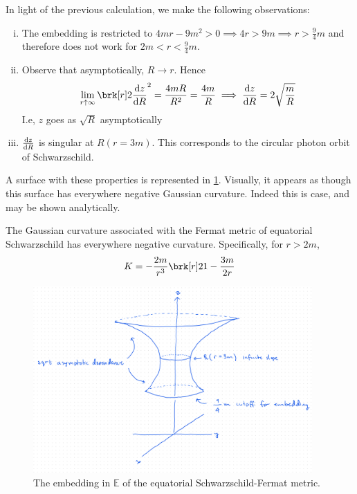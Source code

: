 In light of the previous calculation, we make the following observations:
\begin{enumerate}[i)]
\item The embedding is restricted to $4mr - 9m^2 > 0 \implies 4r > 9m \implies r > \frac{9}{4}m$ and therefore does not work for $2m < r < \frac{9}{4}m$.
\item Observe that asymptotically, $R \rightarrow r$. Hence
\begin{equation}\label{}
\lim_{r \uparrow \infty} \brk[r]2{\diff{z}{R}}^2 = \frac{4mR}{R^2} = \frac{4m}{R} \implies \diff{z}{R} = 2\sqrt{\frac{m}{R}}
\end{equation}
I.e, $z$ goes as $\sqrt{R}$ asymptotically
\item
$\diff{z}{R}$ is singular at $R(r=3m)$. This corresponds to the circular photon orbit of Schwarzschild.
\end{enumerate}
%
A surface with these properties is represented in \ref{fig:embedding}.
Visually, it appears as though this surface has everywhere negative Gaussian curvature. Indeed this is case, and may be shown analytically.
\begin{proposition}[]\label{}
The Gaussian curvature associated with the Fermat metric of equatorial Schwarzschild has everywhere negative curvature. Specifically, for $r > 2m$,
\begin{equation}\label{}
K = - \frac{2m}{r^3}\brk[r]2{1 - \frac{3m}{2r}}
\end{equation}
\end{proposition}
%
\begin{figure}[!htb]
	\centering
	\includegraphics[width=0.95\textwidth]{img/embedding.png}
	\caption{The embedding in $\mathbb{E}$ of the equatorial Schwarzschild-Fermat metric.}
	\label{fig:embedding}
\end{figure}

